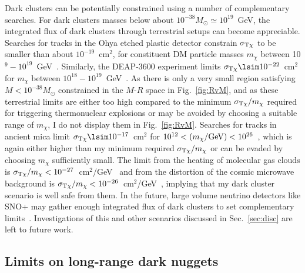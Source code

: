 \documentclass[
    twocolumn,
	prd,
        amssymb,
	preprintnumbers,
	secnumarabic,
	nofootinbib,
	superscriptaddress]{revtex4-1}
\begin{document}
Dark clusters can be potentially constrained using a number of complementary searches.
For dark clusters masses below about $10^{-38} M_\odot \simeq 10^{19}$~GeV, the integrated flux of dark clusters through terrestrial setups can become appreciable.
Searches for tracks in the Ohya etched plastic detector constrain $\sigma_{\rm T\chi}$ to be smaller than about $10^{-19}$~cm$^2$, for constituent DM particle masses $m_\chi$ between 10$^9-10^{19}$~GeV~\cite{Bhoonah:2020fys}.
Similarly, the DEAP-3600 experiment limits $\sigma_{\rm T\chi} \lsim 10^{-22}$~cm$^2$ for $m_\chi$ between $10^{18}-10^{19}$~GeV~\cite{xmaslights:DEAPCollaboration:2021raj}. 
As there is only a very small region satisfying $M < 10^{-38} M_\odot$ constrained in the $M$-$R$ space in Fig.~\ref{fig:RvM}, and as these terrestrial limits are either too high compared to the minimum $\sigma_{\rm T\chi}/m_\chi$ required for triggering thermonuclear explosions or may be avoided by choosing a suitable range of $m_\chi$, I do not display them in Fig.~\ref{fig:RvM}.
Searches for tracks in ancient mica limit $\sigma_{\rm T\chi} \lsim 10^{-17}$~cm$^2$ for $10^{12} < (m_\chi/{\rm GeV}) < 10^{26}$~\cite{Bhoonah:2020fys}, which is again either higher than my minimum required $\sigma_{\rm T\chi}/m_\chi$ or can be evaded by choosing $m_\chi$ sufficiently small. 
The limit from the heating of molecular gas clouds is $\sigma_{\rm T\chi}/m_\chi < 10^{-27}$~cm$^2$/GeV~\cite{gasclouds:Bhoonah:2018gjb} and from the distortion of the cosmic microwave background is $\sigma_{\rm T\chi}/m_\chi < 10^{-26}$~cm$^2$/GeV~\cite{snowmass:Carney:2022gse}, implying that my dark cluster scenario is well safe from them.
In the future, large volume neutrino detectors like SNO+ may gather enough integrated flux of dark clusters to set complementary limits~\cite{xmaslights:Bramante:2018tos,xmaslights:Bramante:2019yss}.
Investigations of this and other scenarios discussed in Sec.~\ref{sec:disc} are left to future work.

\subsection{Limits on long-range dark nuggets}
\label{subsec:limitsnuggets}
\end{document}
